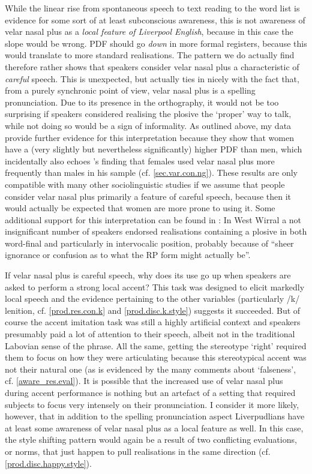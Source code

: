 While the linear rise from spontaneous speech to text reading to the word list is evidence for some sort of at least subconscious awareness, this is not awareness of velar nasal plus as a \emph{local feature of Liverpool English}, because in this case the slope would be wrong.
PDF should go \emph{down} in more formal registers, because this would translate to more standard realisations.
The pattern we do actually find therefore rather shows that speakers consider velar nasal plus a characteristic of \emph{careful} speech.
This is unexpected, but actually ties in nicely with the fact that, from a purely synchronic point of view, velar nasal plus is a spelling pronunciation.
Due to its presence in the orthography, it would not be too surprising if speakers considered realising the plosive the `proper' way to talk, while not doing so would be a sign of informality.
As outlined above, my data provide further evidence for this interpretation because they show that women have a (very slightly but nevertheless significantly) higher PDF than men, which incidentally also echoes \textcite{knowles1973}'s finding that females used velar nasal plus more frequently than males in his sample (cf. \ref{sec.var.con.ng}).
These results are only compatible with many other sociolinguistic studies if we assume that people consider velar nasal plus primarily a feature of careful speech, because then it would actually be expected that women are more prone to using it.
Some additional support for this interpretation can be found in \textcite[cf.][101]{newbrook1999}: In West Wirral a not insignificant number of speakers endorsed realisations containing a plosive in both word-final and particularly in intervocalic position, probably because of ``sheer ignorance or confusion as to what the RP form might actually be''.

If velar nasal plus is careful speech, why does its use go up when speakers are asked to perform a strong local accent?
This task was designed to elicit markedly local speech and the evidence pertaining to the other variables (particularly /k/ lenition, cf. \ref{prod.res.con.k} and \ref{prod.disc.k.style}) suggests it succeeded.
But of course the accent imitation task was still a highly artificial context and speakers presumably paid a lot of attention to their speech, albeit not in the traditional Labovian sense of the phrase.
All the same, getting the stereotype `right' required them to focus on how they were articulating because this stereotypical accent was not their natural one (as is evidenced by the many comments about `falseness', cf. \ref{aware_res.eval}).
It is possible that the increased use of velar nasal plus during accent performance is nothing but an artefact of a setting that required subjects to focus very intensely on their pronunciation.
I consider it more likely, however, that in addition to the spelling pronunciation aspect Liverpudlians have at least some awareness of velar nasal plus as a local feature as well.
In this case, the style shifting pattern would again be a result of two conflicting evaluations, or norms, that just happen to pull realisations in the same direction (cf. \ref{prod.disc.happy.style}).

